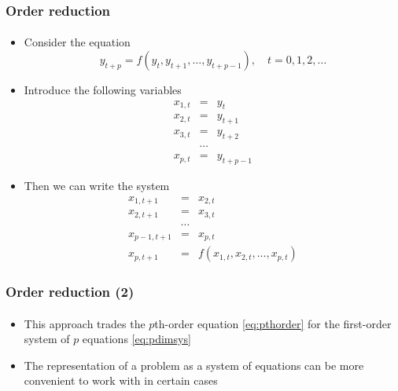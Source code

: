 \documentclass[10pt,usenames,dvipsnames]{beamer}
\theoremstyle{plain}
\theoremstyle{definition}
\begin{document}
\begin{frame}[fragile]
	\frametitle{Order reduction}
	\framesubtitle{}
		\begin{itemize}
		\item Consider the equation \begin{equation}
			y_{t+p} = f(y_{t}, y_{t+1}, \ldots, y_{t+p-1}), \quad t = 0, 1, 2, \ldots
			\label{eq:pthorder}
		\end{equation} 
		\item Introduce the following variables
		\[
		\begin{array}{lll}
			x_{1,t} & = & y_t\\
			x_{2,t} & = & y_{t+1}\\
			x_{3,t} & = & y_{t+2}\\
			& \cdots &\\
			x_{p,t} & = & y_{t+p-1}
		\end{array}
		\]
		\item Then we can write the system
		\begin{equation}
					\begin{array}{lll}
				x_{1,t+1} & = & x_{2,t}\\
				x_{2,t+1} & = & x_{3,t}\\
				& \cdots &\\
				x_{p-1,t+1} & = & x_{p,t}\\
				x_{p,t+1} & = & f(x_{1,t},x_{2,t},\ldots,x_{p,t})
			\end{array}
			\label{eq:pdimsys}
		\end{equation}
	\end{itemize}
\end{frame}

\begin{frame}[fragile]
	\frametitle{Order reduction (2)}
	\framesubtitle{}
	\begin{itemize}
		\item This approach trades the $p$th-order equation \eqref{eq:pthorder} for the first-order system of $p$ equations \eqref{eq:pdimsys}
		\item The representation of a problem as a system of equations can be more convenient to work with in certain cases
	\end{itemize}
\end{frame}
\end{document}

